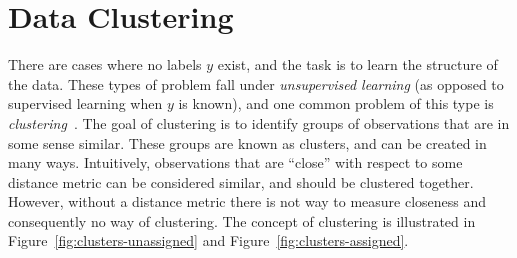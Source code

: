 
\section{Data Clustering}
There are cases where no labels $y$ exist, and the
task is to learn the structure of the data. These types of problem
fall under \textit{unsupervised learning} (as opposed to supervised
learning when $y$ is known), and one common problem of this type is
\textit{clustering}~\cite{Bishop-2006}. The goal of clustering is to
identify groups of observations that are in some sense similar. These
groups are known as clusters, and can be created in many ways. Intuitively,
observations that are ``close'' with respect to some distance metric
can be considered similar, and should be clustered together. However,
without a distance metric there is not way to measure closeness and consequently
no way of clustering. The concept of clustering is illustrated in
Figure~\ref{fig:clusters-unassigned} and Figure~\ref{fig:clusters-assigned}.
